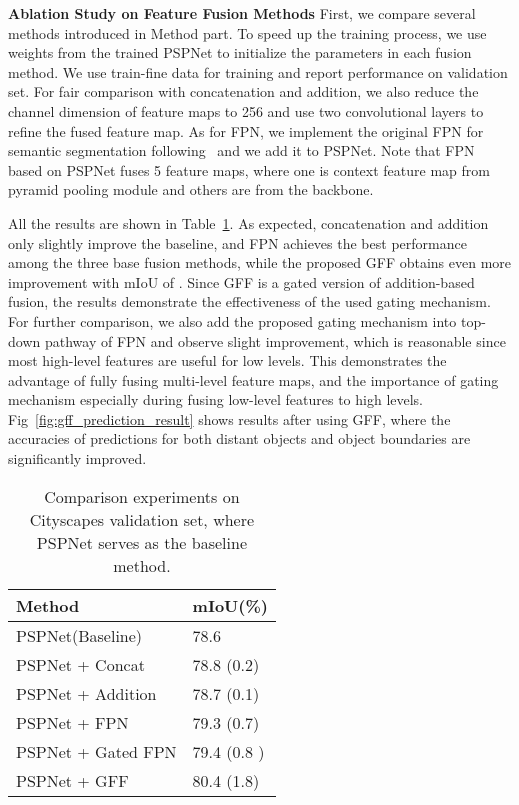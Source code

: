 \documentclass[letterpaper]{article} \usepackage{aaai20}  \usepackage{times}  \usepackage{helvet} \usepackage{courier}  \usepackage[hyphens]{url}  \usepackage{graphicx} \urlstyle{rm} \def\UrlFont{\rm}  \usepackage{graphicx}  \usepackage{amsmath}
\begin{document}
\noindent
\textbf{Ablation Study on Feature Fusion Methods} First, we compare several methods introduced in Method part. To speed up the training process, we use weights from the trained PSPNet to initialize the parameters in each fusion method. We use train-fine data for training and report performance on validation set. For fair comparison with concatenation and addition, we also reduce the channel dimension of feature maps to 256 and use two  convolutional layers to refine the fused feature map. As for FPN, we implement the original FPN for semantic segmentation following~\cite{fpn_slide} and we add it to PSPNet. Note that FPN based on PSPNet fuses 5 feature maps, where one is context feature map from pyramid pooling module and others are from the backbone. 

All the results are shown in Table~\ref{tab:exam_cityscapes}. As expected, concatenation and addition only slightly improve the baseline, and FPN achieves the best performance among the three base fusion methods, while the proposed GFF obtains even  more improvement with mIoU of . Since GFF is a gated version of addition-based fusion, the results demonstrate the effectiveness of the used gating mechanism. For further comparison, we also add the proposed gating mechanism into top-down pathway of FPN and observe slight improvement, which is reasonable since most high-level features are useful for low levels. This demonstrates the advantage of fully fusing multi-level feature maps, and the importance of gating mechanism especially during fusing low-level features to high levels. Fig~\ref{fig:gff_prediction_result} shows results after using GFF, where the accuracies of predictions for both distant objects and object boundaries are significantly improved.

\begin{table}[!t]
    \centering
    \begin{tabular}{l|l}
    \hline
    Method & mIoU(\%) \\
    \hline
    PSPNet(Baseline) & 78.6 \\
    PSPNet + Concat & 78.8 (0.2)\\
    PSPNet + Addition & 78.7 (0.1)\\
    PSPNet + FPN & 79.3 (0.7) \\
    \hline
    PSPNet + Gated FPN & 79.4 (0.8 ) \\
    \hline \hline
    PSPNet + GFF & 80.4 (1.8) \\
    \hline
    \end{tabular}
     \caption{Comparison experiments on Cityscapes validation set, where PSPNet serves as the baseline method.}
     \label{tab:exam_cityscapes}
\end{table}
\end{document}
